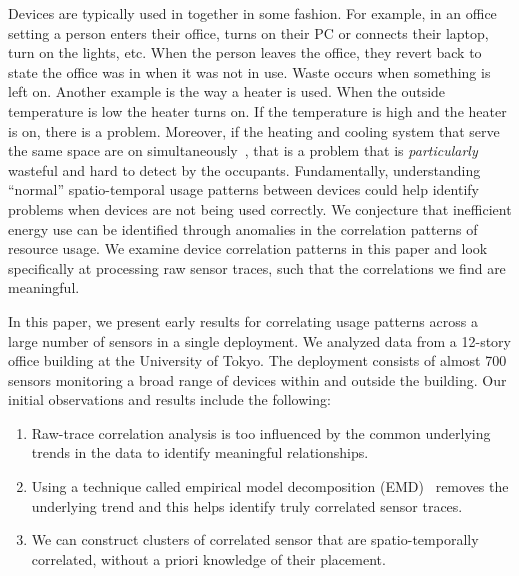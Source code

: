 Devices are typically used in together in some fashion.  For example, in an office
setting a person enters their office, turns on their PC or connects their laptop, turn on the lights, etc.
When the person leaves the office, they revert back to state the office was in when it was
not in use.  Waste occurs when something is left on.  Another example is the way a heater is used.  
When the outside temperature is low the heater turns on.  If the temperature is high and the heater is on, there
is a problem.  Moreover, if the heating and cooling system that serve the same space are on 
simultaneously~\cite{simheatcool}, that
is a problem that is \emph{particularly} wasteful and hard to detect by the occupants.  
Fundamentally, understanding ``normal'' spatio-temporal usage patterns between devices could help
identify problems when devices are not being used correctly. %
We conjecture that inefficient energy use can be identified through anomalies in the correlation
patterns of resource usage.  We examine device correlation patterns in this paper and look specifically
at processing raw sensor traces, such that the correlations we find are meaningful.


 

In this paper, we present early results for correlating usage patterns across a large number of sensors
in a single deployment.  We analyzed data from a 12-story office building at the University of Tokyo.  
The deployment consists of almost 700 sensors monitoring a broad range of devices within and outside 
the building.  Our initial observations and results include the following:

\begin{enumerate}
\item Raw-trace correlation analysis is too influenced by the common underlying trends in the data
	to identify meaningful relationships.
\item Using a technique called empirical model decomposition (EMD)~\cite{huang:emd1998} removes the 
		underlying trend and this helps identify truly correlated sensor traces.
\item We can construct clusters of correlated sensor that are spatio-temporally correlated, without
		a priori knowledge of their placement.
\end{enumerate}


